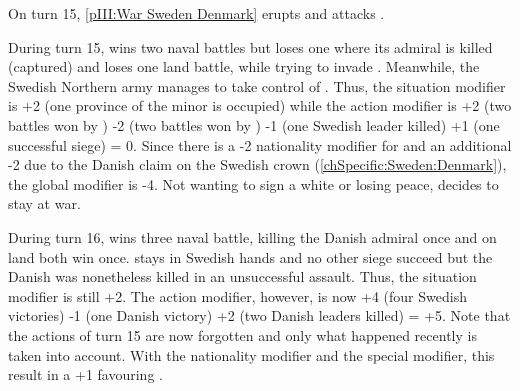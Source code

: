 \begin{exemple}
  On turn 15, \ref{pIII:War Sweden Denmark} erupts and \paysDanemark attacks
  \SUE.

  During turn 15, \SUE wins two naval battles but loses one where its admiral
  is killed (captured) and loses one land battle, while trying to invade
  \provinceSkane. Meanwhile, the Swedish Northern army manages to take control
  of \provinceTrondelag. Thus, the situation modifier is +2 (one province of
  the minor is occupied) while the action modifier is +2 (two battles won by
  \SUE) -2 (two battles won by \paysDanemark) -1 (one Swedish leader killed)
  +1 (one successful siege) = 0. Since there is a -2 nationality modifier for
  \paysDanemark and an additional -2 due to the Danish claim on the Swedish
  crown (\ref{chSpecific:Sweden:Denmark}), the global modifier is -4. Not
  wanting to sign a white or losing peace, \SUE decides to stay at war.

  \smallskip

  During turn 16, \SUE wins three naval battle, killing the Danish admiral
  once and on land both win once. \provinceTrondelag stays in Swedish hands
  and no other siege succeed but the Danish \leaderRantzau was nonetheless
  killed in an unsuccessful assault. Thus, the situation modifier is still
  +2. The action modifier, however, is now +4 (four Swedish victories) -1 (one
  Danish victory) +2 (two Danish leaders killed) = +5. Note that the actions
  of turn 15 are now forgotten and only what happened recently is taken into
  account. With the nationality modifier and the special modifier, this result
  in a +1 favouring \SUE.


\end{exemple}

